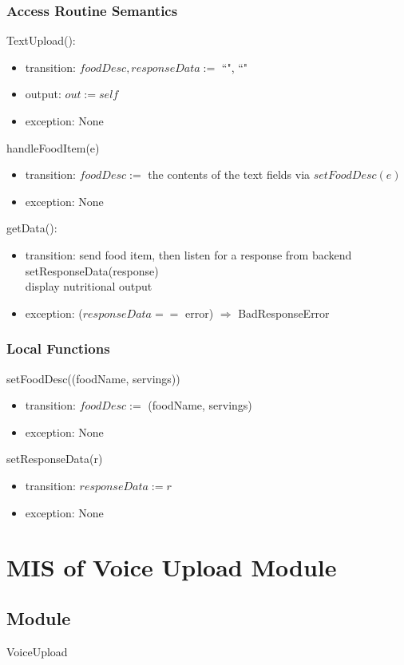 \documentclass[12pt, titlepage]{article}
\begin{document}
\subsubsection{Access Routine Semantics}
\noindent TextUpload():
\begin{itemize}
	\item transition: $foodDesc, responseData := $ ``", ``"
	\item output: $out := self$ 
	\item exception: None
\end{itemize}
\noindent handleFoodItem(e)
\begin{itemize}
	\item transition: $foodDesc :=$ the contents of the text fields via 
	$setFoodDesc(e)$
	\item exception: None
\end{itemize}
\noindent getData():
\begin{itemize}
	\item transition: send food item, then listen for a response from 
	backend\\ setResponseData(response) \\ display nutritional output
	\item exception: ($responseData ==$ error) $\Rightarrow$ BadResponseError
\end{itemize}
\subsubsection{Local Functions}
\noindent setFoodDesc((foodName, servings))
\begin{itemize}
	\item transition: $ foodDesc := $ (foodName, servings)
	\item exception: None
\end{itemize}
\noindent setResponseData(r)
\begin{itemize}
	\item transition: $ responseData:=r $
	\item exception: None
\end{itemize}

\newpage

\section{MIS of Voice Upload Module} \label{VoiceUpload} 
\subsection{Module}
VoiceUpload
\end{document}

